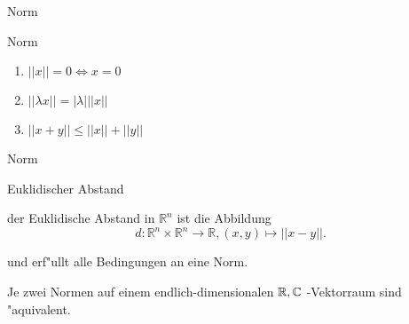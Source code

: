 \documentclass[class=article, crop=false]{standalone}
\begin{document}
\begin{zettel}{Norm}

\begin{flashcard}[w92g4b9m]{Norm}
	\begin{definition}[Norm]
		\begin{enumerate}
			\item $ ||x|| = 0 \iff x = 0$
			\item $ ||\lambda x|| = |\lambda| ||x||$
			\item $ ||x + y|| \leq  ||x|| + ||y||$
		\end{enumerate}
	\end{definition}
\end{flashcard}

\begin{flashcard}[3hvvgidq]{Norm}
	\begin{question}
		Euklidischer Abstand
	\end{question}
	\begin{definition}
		der Euklidische Abstand in $\mathbb{R}^n $ ist die Abbildung
		\[
			d: \mathbb{R}^n \times \mathbb{R}^n \longrightarrow  \mathbb{R}, (x,y) \mapsto ||x-y||
		.\]
	\end{definition}
	und erf"ullt alle Bedingungen an eine Norm.
\end{flashcard}

\begin{theorem}
	Je zwei Normen auf einem endlich-dimensionalen $\mathbb{R},\mathbb{C} $ -Vektorraum sind "aquivalent.
\end{theorem}

\end{zettel}
\end{document}
